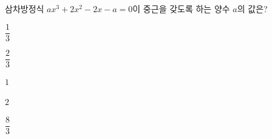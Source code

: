 삼차방정식 $ax^3+2x^2-2x-a=0$이 중근을 갖도록 하는 양수 $a$의 값은?
\begin{choicesii}{\rule[-3ex]{0pt}{8ex}$\dfrac{1}{3}$}{\rule[-3ex]{0pt}{8ex}$\dfrac{2}{3}$}{\rule[-3ex]{0pt}{8ex}$1$}{\rule[-3ex]{0pt}{8ex}$2$}{\rule[-3ex]{0pt}{8ex}$\dfrac{8}{3}$}\end{choicesii}

